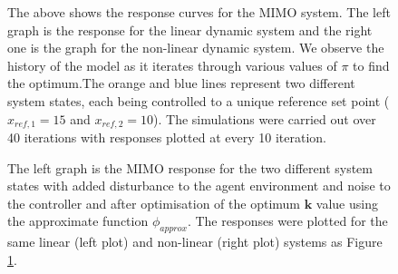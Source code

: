 \documentclass[conference]{IEEEtran}
\theoremstyle{definition}
\begin{document}
\begin{figure}[h]
    \caption{The above shows the response curves for the MIMO system. The left graph is the response for the linear dynamic system and the right one is the graph for the non-linear dynamic system. We observe the history of the model as it iterates through various values of $\pi$ to find the optimum.The orange and blue lines represent two different system states, each being controlled to a unique reference set point ($x_{ref,1}=15$ and $x_{ref,2}=10$). The simulations were carried out over 40 iterations with responses plotted at every 10 iteration.}
    \label{mimo_smooth}
\end{figure}

\begin{figure}[h]
    \caption{The left graph is the MIMO response for the two different system states with added disturbance to the agent environment and noise to the controller and after optimisation of the optimum $\mathbf{k}$ value using the approximate function $\phi_{approx}$. The responses were plotted for the same linear (left plot) and non-linear (right plot) systems as Figure \ref{mimo_smooth}.}
    \label{mimo_rough}
\end{figure}
\end{document}
